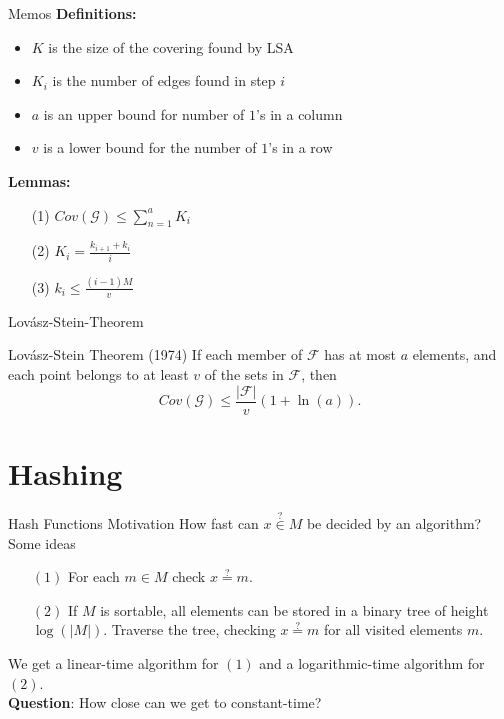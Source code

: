 \documentclass[10pt]{beamer}
\begin{document}
\begin{frame}[fragile]{Memos}
    \textbf{Definitions:} \pause
    \begin{itemize}
        \item $ K $ is the size of the covering found by LSA \pause
        \item $ K_i $ is the number of edges found in step $ i $ \pause
        \item $ a $ is an upper bound for number of $ 1 $'s in a column \pause
        \item $ v $ is a lower bound for the number of $ 1 $'s in a row \pause
    \end{itemize}

    \textbf{Lemmas:}
    \begin{itemize}
        \item[(1)] $ Cov(\mathcal{G}) \leq \sum_{n=1}^a K_i$ \pause
        \item[(2)] $ K_i = \frac{k_{i+1} + k_i}{i} $ \pause
        \item[(3)] $ k_i \leq \frac{(i-1)M}{v}$
    \end{itemize}
\end{frame}



\begin{frame}[fragile]{Lovász-Stein-Theorem}
    \begin{block}{Lovász-Stein Theorem (1974)}
        If each member of $ \mathcal{F} $ has at most $ a $ elements,
        and each point belongs to at least $ v $ of the sets in $ \mathcal{F} $, then
        \[
            Cov(\mathcal{G}) \leq \frac{|\mathcal{F}|}{v}(1 + \ln(a)).
        \]
    \end{block}
\end{frame}

\section{Hashing}

\begin{frame}[fragile]{Hash Functions Motivation}
    How fast can $ x \stackrel{?}{\in} M $ be decided by an algorithm? \pause
    \\
    \vspace{1em}
    Some ideas
    \begin{itemize}
        \item[$ (1) $] For each $ m \in M $ check $ x \stackrel{?}{=} m $.\pause
        \item[$ (2) $] If $ M $ is sortable, all elements can be stored in a binary tree of height $ \log (|M|)$.
        Traverse the tree, checking $ x \stackrel{?}{=} m $ for all visited elements $ m $.\pause
    \end{itemize}
    We get a linear-time algorithm for $ (1) $ and a logarithmic-time algorithm for $ (2) $.\pause
    \\
    \vfill
    \textbf{Question}: How close can we get to constant-time?
\end{frame}
\end{document}
